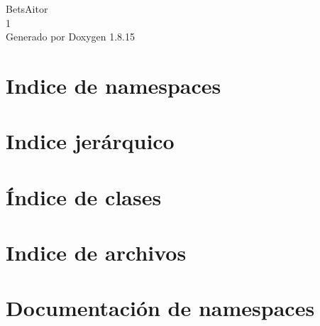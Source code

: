 \let\mypdfximage\pdfximage\def\pdfximage{\immediate\mypdfximage}\documentclass[twoside]{book}
\newcommand{\+}{\discretionary{\mbox{\scriptsize$\hookleftarrow$}}{}{}}
\newcommand{\clearemptydoublepage}{%
  \newpage{\pagestyle{empty}\cleardoublepage}%
}
\begin{document}
\hypersetup{pageanchor=false,
             bookmarksnumbered=true,
             pdfencoding=unicode
            }
\begin{titlepage}
\vspace*{7cm}
\begin{center}%
{\Large Bets\+Aitor \\[1ex]\large 1 }\\
\vspace*{1cm}
{\large Generado por Doxygen 1.8.15}\\
\end{center}
\end{titlepage}
\clearemptydoublepage
{}
\tableofcontents
\clearemptydoublepage
{}
\hypersetup{pageanchor=true}

\chapter{Indice de namespaces}

\chapter{Indice jerárquico}

\chapter{Índice de clases}

\chapter{Indice de archivos}

\chapter{Documentación de namespaces}






\end{document}
